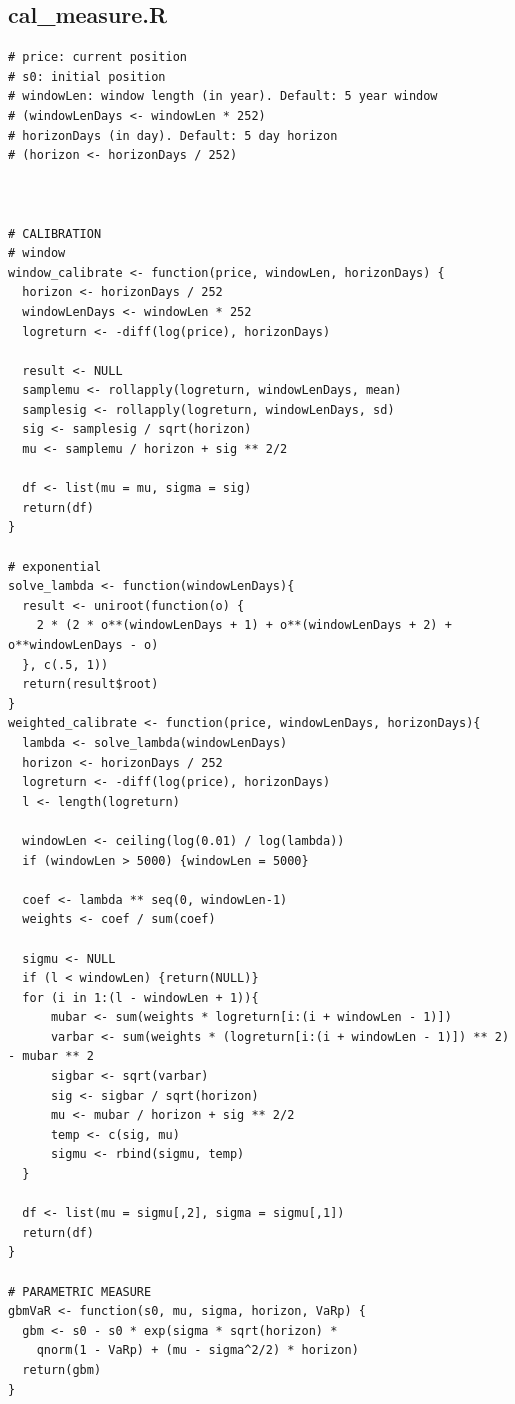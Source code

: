 \documentclass[letterpaper,11pt, oneside]{layout}
\begin{document}
\begin{spacing}{1}
\section{cal\_measure.R}
\label{sec:code:st}
\begin{lstlisting}
# price: current position
# s0: initial position
# windowLen: window length (in year). Default: 5 year window
# (windowLenDays <- windowLen * 252)
# horizonDays (in day). Default: 5 day horizon
# (horizon <- horizonDays / 252)



# CALIBRATION
# window
window_calibrate <- function(price, windowLen, horizonDays) {
  horizon <- horizonDays / 252
  windowLenDays <- windowLen * 252
  logreturn <- -diff(log(price), horizonDays)
  
  result <- NULL
  samplemu <- rollapply(logreturn, windowLenDays, mean)
  samplesig <- rollapply(logreturn, windowLenDays, sd)
  sig <- samplesig / sqrt(horizon)
  mu <- samplemu / horizon + sig ** 2/2

  df <- list(mu = mu, sigma = sig)
  return(df)
}

# exponential
solve_lambda <- function(windowLenDays){
  result <- uniroot(function(o) {
    2 * (2 * o**(windowLenDays + 1) + o**(windowLenDays + 2) + o**windowLenDays - o)
  }, c(.5, 1))
  return(result$root)
}
weighted_calibrate <- function(price, windowLenDays, horizonDays){
  lambda <- solve_lambda(windowLenDays)
  horizon <- horizonDays / 252
  logreturn <- -diff(log(price), horizonDays)
  l <- length(logreturn)
  
  windowLen <- ceiling(log(0.01) / log(lambda))
  if (windowLen > 5000) {windowLen = 5000}

  coef <- lambda ** seq(0, windowLen-1)
  weights <- coef / sum(coef)
  
  sigmu <- NULL
  if (l < windowLen) {return(NULL)}
  for (i in 1:(l - windowLen + 1)){
      mubar <- sum(weights * logreturn[i:(i + windowLen - 1)])
      varbar <- sum(weights * (logreturn[i:(i + windowLen - 1)]) ** 2) - mubar ** 2
      sigbar <- sqrt(varbar)
      sig <- sigbar / sqrt(horizon)
      mu <- mubar / horizon + sig ** 2/2
      temp <- c(sig, mu)
      sigmu <- rbind(sigmu, temp)
  }
   
  df <- list(mu = sigmu[,2], sigma = sigmu[,1])
  return(df)
}

# PARAMETRIC MEASURE
gbmVaR <- function(s0, mu, sigma, horizon, VaRp) {
  gbm <- s0 - s0 * exp(sigma * sqrt(horizon) * 
    qnorm(1 - VaRp) + (mu - sigma^2/2) * horizon)
  return(gbm)
}



\end{lstlisting}
\end{spacing}
\end{document}
